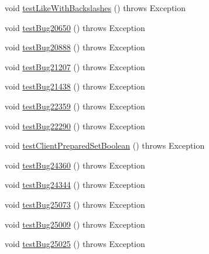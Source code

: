 \begin{DoxyCompactItemize}
\item 
void \mbox{\hyperlink{classtestsuite_1_1regression_1_1_statement_regression_test_a0d2d4005580ed91cedff282491537e23}{test\+Like\+With\+Backslashes}} ()  throws Exception 
\item 
void \mbox{\hyperlink{classtestsuite_1_1regression_1_1_statement_regression_test_ac72c67849f782594f7036b96b6053eed}{test\+Bug20650}} ()  throws Exception 
\item 
void \mbox{\hyperlink{classtestsuite_1_1regression_1_1_statement_regression_test_a1c0e3e171ebbd64605711647d9b930c0}{test\+Bug20888}} ()  throws Exception 
\item 
void \mbox{\hyperlink{classtestsuite_1_1regression_1_1_statement_regression_test_a16c4c52784a96bfcf47397ce9a1d0efb}{test\+Bug21207}} ()  throws Exception 
\item 
void \mbox{\hyperlink{classtestsuite_1_1regression_1_1_statement_regression_test_a47c163cd72fcd1b2cf392941cd2b074c}{test\+Bug21438}} ()  throws Exception 
\item 
void \mbox{\hyperlink{classtestsuite_1_1regression_1_1_statement_regression_test_a0e9ad9980acf6229f9b41dff9972e1c5}{test\+Bug22359}} ()  throws Exception 
\item 
void \mbox{\hyperlink{classtestsuite_1_1regression_1_1_statement_regression_test_ae2acdb736d0a4481a43f894bd9f40499}{test\+Bug22290}} ()  throws Exception 
\item 
void \mbox{\hyperlink{classtestsuite_1_1regression_1_1_statement_regression_test_ac16a79beb37a6d25b917a295dae9828d}{test\+Client\+Prepared\+Set\+Boolean}} ()  throws Exception 
\item 
void \mbox{\hyperlink{classtestsuite_1_1regression_1_1_statement_regression_test_a3334c82a4ef7ac982bf6eca6fc081027}{test\+Bug24360}} ()  throws Exception 
\item 
void \mbox{\hyperlink{classtestsuite_1_1regression_1_1_statement_regression_test_a4da675927e9f55846b0ea0781c439c48}{test\+Bug24344}} ()  throws Exception 
\item 
void \mbox{\hyperlink{classtestsuite_1_1regression_1_1_statement_regression_test_a67cdc2b43a1d7ac490ee30dd639ebd48}{test\+Bug25073}} ()  throws Exception 
\item 
void \mbox{\hyperlink{classtestsuite_1_1regression_1_1_statement_regression_test_a857b7ade8c7c4e47bd7f0c8340d91386}{test\+Bug25009}} ()  throws Exception 
\item 
void \mbox{\hyperlink{classtestsuite_1_1regression_1_1_statement_regression_test_ae15552bf551f9a8b5b291264142f57ae}{test\+Bug25025}} ()  throws Exception 

\end{DoxyCompactItemize}
